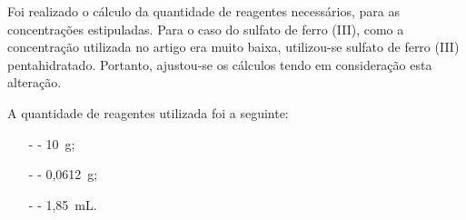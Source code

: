 Foi realizado o cálculo da quantidade de reagentes necessários, para as concentrações estipuladas. 
Para o caso do sulfato de ferro (III), como a concentração utilizada no artigo era muito baixa, utilizou-se sulfato de ferro (III) pentahidratado. Portanto, ajustou-se os cálculos tendo em consideração esta alteração.

A quantidade de reagentes utilizada foi a seguinte:
\begin{itemize}
    \item[-] \tio{} - 10~g;
    \item[-] \sulfe{} - 0,0612~g;
    \item[-] \acsul{} - 1,85~mL.
\end{itemize}

